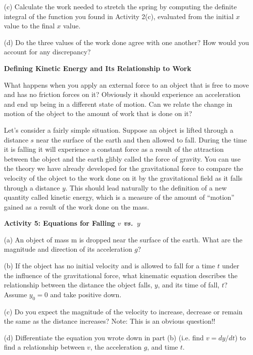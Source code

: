 (c) Calculate the work needed to stretch the spring by computing the definite 
integral of the function you found in Activity 2(c), evaluated from the 
initial $x$ value to the final $x$ value.
\answerspace{20mm}

(d) Do the three values of the work done agree with one another? How would 
you account for any discrepancy?
\answerspace{20mm}


\textbf{Defining Kinetic Energy and Its Relationship to Work} 

What happens when you apply an external force to an object that is free to move
and has no friction forces on it? Obviously it should experience an acceleration
and end up being in a different state of motion. Can we relate the change in
motion of the object to the amount of work that is done on it?

Let's consider a fairly simple situation. Suppose an object is lifted through
a distance $s$ near the surface of the earth and then allowed to fall. During
the time it is falling it will experience a constant force as a result of the
attraction between the object and the earth glibly called the force of gravity.
You can use the theory we have already developed for the gravitational force
to compare the velocity of the object to the work done on it by the gravitational
field as it falls through a distance 
$y$. This should lead naturally to the definition
of a new quantity called kinetic energy, which is a measure of the amount of
``motion'' gained as a result of the work done on the mass. 

\textbf{Activity 5: Equations for Falling $v$ \textit{vs.}~$y$ }

(a) An object of mass m is dropped near the surface of the earth. What are the
magnitude and direction of its acceleration $g$?
\answerspace{10mm}

(b) If the object has no initial velocity and is allowed to fall for a time
$t$ under the influence of the gravitational force, what kinematic equation describes the relationship between the distance the object falls, $y$, and its time of fall, $t$? Assume \( y_{0}=0 \) and take positive down.
\answerspace{10mm}

\pagebreak[2]
(c) Do you expect the magnitude of the velocity to increase, decrease or remain
the same as the distance increases? Note: This is an obvious question!!
\answerspace{10mm}

(d) Differentiate the equation you wrote down in part (b) (i.e. find $v = dy/dt$) to find a relationship between $v$, the acceleration $g$, and time $t$.
\answerspace{20mm}

